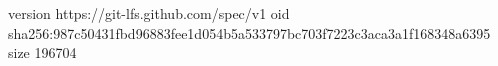 version https://git-lfs.github.com/spec/v1
oid sha256:987c50431fbd96883fee1d054b5a533797bc703f7223c3aca3a1f168348a6395
size 196704
